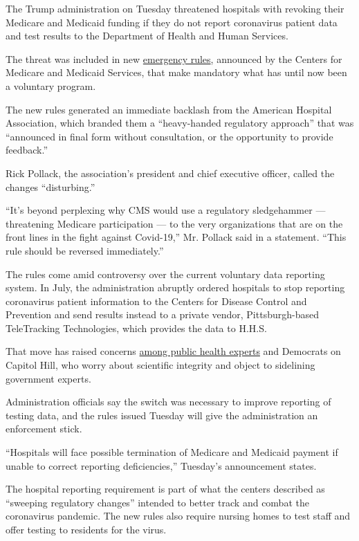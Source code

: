 The Trump administration on Tuesday threatened hospitals with revoking
their Medicare and Medicaid funding if they do not report coronavirus
patient data and test results to the Department of Health and Human
Services.

The threat was included in new
\href{https://www.cms.gov/newsroom/press-releases/trump-administration-strengthens-covid-19-surveillance-new-reporting-and-testing-requirements}{emergency
rules}, announced by the Centers for Medicare and Medicaid Services,
that make mandatory what has until now been a voluntary program.

The new rules generated an immediate backlash from the American Hospital
Association, which branded them a ``heavy-handed regulatory approach''
that was ``announced in final form without consultation, or the
opportunity to provide feedback.''

Rick Pollack, the association's president and chief executive officer,
called the changes ``disturbing.''

``It's beyond perplexing why CMS would use a regulatory sledgehammer ---
threatening Medicare participation --- to the very organizations that
are on the front lines in the fight against Covid-19,'' Mr. Pollack said
in a statement. ``This rule should be reversed immediately.''

The rules come amid controversy over the current voluntary data
reporting system. In July, the administration abruptly ordered hospitals
to stop reporting coronavirus patient information to the Centers for
Disease Control and Prevention and send results instead to a private
vendor, Pittsburgh-based TeleTracking Technologies, which provides the
data to H.H.S.

That move has raised concerns
\href{https://slack-redir.net/link?url=https\%3A\%2F\%2Fwww.nytimes3xbfgragh.onion\%2F2020\%2F08\%2F12\%2Fus\%2Fpolitics\%2Fhealth-experts-warning-coronavirus-data.html}{among
public health experts} and Democrats on Capitol Hill, who worry about
scientific integrity and object to sidelining government experts.

Administration officials say the switch was necessary to improve
reporting of testing data, and the rules issued Tuesday will give the
administration an enforcement stick.

``Hospitals will face possible termination of Medicare and Medicaid
payment if unable to correct reporting deficiencies,'' Tuesday's
announcement states.

The hospital reporting requirement is part of what the centers described
as ``sweeping regulatory changes'' intended to better track and combat
the coronavirus pandemic. The new rules also require nursing homes to
test staff and offer testing to residents for the virus.


